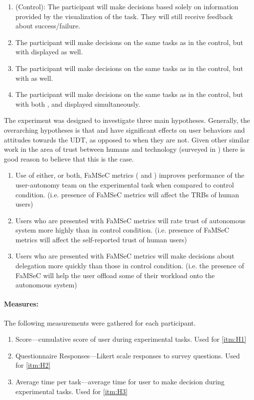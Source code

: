     \begin{enumerate}[label=\textbf{C\arabic*}]
        \item (Control): The participant will make decisions based solely on information provided by the visualization of the task. They will still receive feedback about success/failure. \label{itm:C1}
        \item The participant will make decisions on the same tasks as in the control, but with \xQ{} displayed as well.\label{itm:C2}
        \item The participant will make decisions on the same tasks as in the control, but with \xO{} as well. \label{itm:C3}
        \item The participant will make decisions on the same tasks as in the control, but with both \xQ{}, and \xO{} displayed simultaneously. \label{itm:C4}
    \end{enumerate}

    The experiment was designed to investigate three main hypotheses. Generally, the overarching hypotheses is that \xQ{} and \xO{} have significant effects on user behaviors and attitudes towards the UDT, as opposed to when they are not. Given other similar work in the area of trust between humans and technology (surveyed in \cite{Israelsen2017-ym}) there is good reason to believe that this is the case.

    \begin{enumerate}[label=\textbf{H\arabic*}]
        \item Use of either, or both, FaMSeC metrics (\xQ{} and \xO{}) improves performance of the user-autonomy team on the experimental task when compared to control condition. (i.e. presence of FaMSeC metrics will affect the TRBs of human users) \label{itm:H1}
        \item Users who are presented with FaMSeC metrics will rate trust of autonomous system more highly than in control condition. (i.e. presence of FaMSeC metrics will affect the self-reported trust of human users) \label{itm:H2}
        \item Users who are presented with FaMSeC metrics will make decisions about delegation more quickly than those in control condition. (i.e. the presence of FaMSeC will help the user offload some of their workload onto the autonomous system) \label{itm:H3}
    \end{enumerate}

    \paragraph{Measures:}
    The following measurements were gathered for each participant.
    \begin{enumerate}[label=\textbf{M\arabic*}]
        \item Score---cumulative score of user during experimental tasks. Used for \ref{itm:H1}
        \item Questionnaire Responses---Likert scale responses to survey questions. Used for \ref{itm:H2}
        \item Average time per task---average time for user to make decision during experimental tasks. Used for \ref{itm:H3}
    \end{enumerate}

